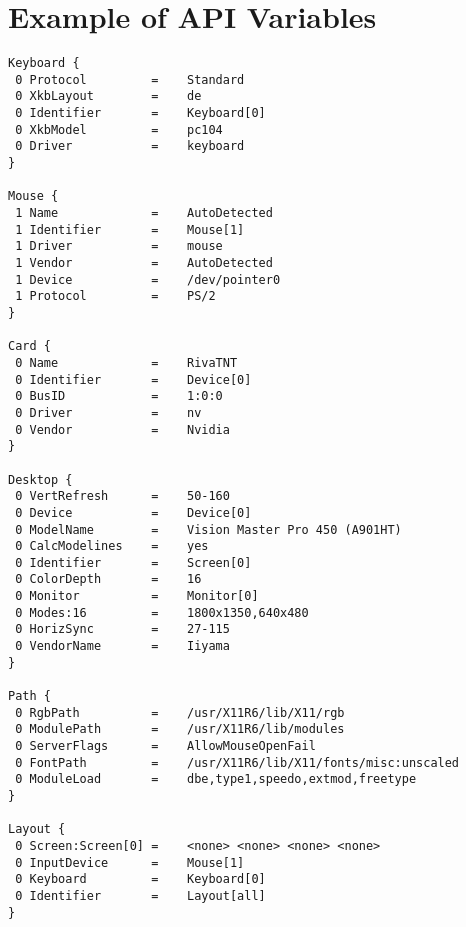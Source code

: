 \section{Example of API Variables}
\begin{small}
\begin{verbatim}
Keyboard {
 0 Protocol         =    Standard
 0 XkbLayout        =    de
 0 Identifier       =    Keyboard[0]
 0 XkbModel         =    pc104
 0 Driver           =    keyboard
}

Mouse {
 1 Name             =    AutoDetected
 1 Identifier       =    Mouse[1]
 1 Driver           =    mouse
 1 Vendor           =    AutoDetected
 1 Device           =    /dev/pointer0
 1 Protocol         =    PS/2
}

Card {
 0 Name             =    RivaTNT
 0 Identifier       =    Device[0]
 0 BusID            =    1:0:0
 0 Driver           =    nv
 0 Vendor           =    Nvidia
}

Desktop {
 0 VertRefresh      =    50-160
 0 Device           =    Device[0]
 0 ModelName        =    Vision Master Pro 450 (A901HT)
 0 CalcModelines    =    yes
 0 Identifier       =    Screen[0]
 0 ColorDepth       =    16
 0 Monitor          =    Monitor[0]
 0 Modes:16         =    1800x1350,640x480
 0 HorizSync        =    27-115
 0 VendorName       =    Iiyama
}

Path {
 0 RgbPath          =    /usr/X11R6/lib/X11/rgb
 0 ModulePath       =    /usr/X11R6/lib/modules
 0 ServerFlags      =    AllowMouseOpenFail
 0 FontPath         =    /usr/X11R6/lib/X11/fonts/misc:unscaled
 0 ModuleLoad       =    dbe,type1,speedo,extmod,freetype
}

Layout {
 0 Screen:Screen[0] =    <none> <none> <none> <none>
 0 InputDevice      =    Mouse[1]
 0 Keyboard         =    Keyboard[0]
 0 Identifier       =    Layout[all]
}
\end{verbatim}
\end{small}
